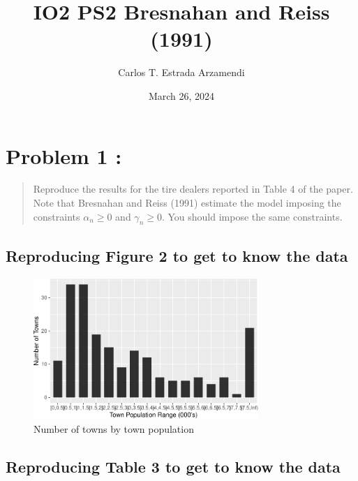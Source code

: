 \documentclass[
  a4paper,
  DIV=11,
  numbers=noendperiod]{scrartcl}
\title{IO2 PS2 Bresnahan and Reiss (1991)}
\author{Carlos T. Estrada Arzamendi}
\date{March 26, 2024}
\begin{document}
\maketitle

\section{Problem 1 :}\label{problem-1}

\begin{quote}
Reproduce the results for the tire dealers reported in Table 4 of the
paper. Note that Bresnahan and Reiss (1991) estimate the model imposing
the constraints \(\alpha_n \geq 0\) and \(\gamma_n \geq 0\). You should
impose the same constraints.
\end{quote}

\subsection{Reproducing Figure 2 to get to know the
data}\label{reproducing-figure-2-to-get-to-know-the-data}

\begin{figure}[H]

{\centering \includegraphics[width=0.76\textwidth,height=\textheight]{IO2_PS2_Estrada_files/figure-pdf/figure2-1.pdf}

}

\caption{Number of towns by town population}

\end{figure}%

\newpage

\subsection{Reproducing Table 3 to get to know the
data}\label{reproducing-table-3-to-get-to-know-the-data}
\end{document}
